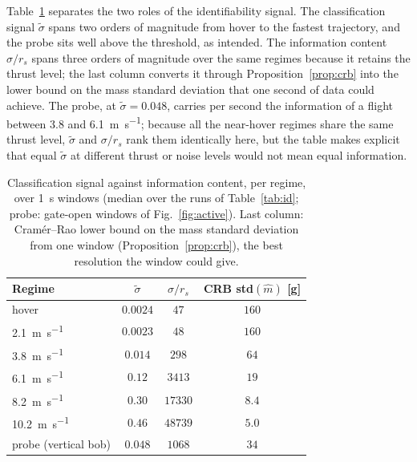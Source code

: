 \documentclass{ieeeaccess}
\begin{document}
Table~\ref{tab:info} separates the two roles of the identifiability signal. The
classification signal $\tilde\sigma$ spans two orders of magnitude from hover to
the fastest trajectory, and the probe sits well above the threshold, as intended.
The information content $\sigma/r_s$ spans three orders of magnitude over the same
regimes because it retains the thrust level; the last column converts it through
Proposition~\ref{prop:crb} into the lower bound on the mass standard deviation
that one second of data could achieve. The probe, at $\tilde\sigma=0.048$, carries per second the information of a
flight between \SI{3.8}{} and \SI{6.1}{\meter\per\second}; because all the
near-hover regimes share the same thrust level, $\tilde\sigma$ and $\sigma/r_s$
rank them identically here, but the table makes explicit that equal
$\tilde\sigma$ at different thrust or noise levels would not mean equal
information.

\begin{table}[t]
\centering
\caption{Classification signal against information content, per regime, over
\SI{1}{\second} windows (median over the runs of Table~\ref{tab:id}; probe:
gate-open windows of Fig.~\ref{fig:active}). Last column: Cram\'er--Rao lower
bound on the mass standard deviation from one window (Proposition~\ref{prop:crb}),
the best resolution the window could give.}
\label{tab:info}
\begin{tabular}{lccc}
\toprule
Regime & $\tilde\sigma$ & $\sigma/r_s$ & CRB std$(\hat m)$ [\si{\gram}] \\
\midrule
hover            & $0.0024$ & $47$    & $160$ \\
\SI{2.1}{\meter\per\second}   & $0.0023$ & $48$    & $160$ \\
\SI{3.8}{\meter\per\second}   & $0.014$  & $298$   & $64$  \\
\SI{6.1}{\meter\per\second}   & $0.12$   & $3413$  & $19$  \\
\SI{8.2}{\meter\per\second}   & $0.30$   & $17330$ & $8.4$ \\
\SI{10.2}{\meter\per\second}  & $0.46$   & $48739$ & $5.0$ \\
probe (vertical bob) & $0.048$ & $1068$ & $34$ \\
\bottomrule
\end{tabular}
\end{table}
\end{document}
